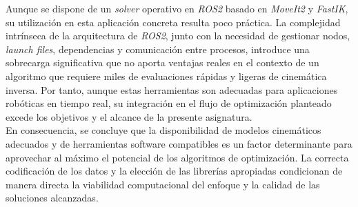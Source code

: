Aunque se dispone de un \textit{solver} operativo en \textit{ROS2} basado en \textit{MoveIt2} y 
\textit{FastIK}, su utilización en esta aplicación concreta resulta poco práctica. La complejidad 
intrínseca de la arquitectura de \textit{ROS2}, junto con la necesidad de gestionar nodos, 
\textit{launch files}, dependencias y comunicación entre procesos, introduce una sobrecarga 
significativa que no aporta ventajas reales en el contexto de un algoritmo que requiere miles de 
evaluaciones rápidas y ligeras de cinemática inversa. Por tanto, aunque estas herramientas son 
adecuadas para aplicaciones robóticas en tiempo real, su integración en el flujo de optimización 
planteado excede los objetivos y el alcance de la presente asignatura. \\

En consecuencia, se concluye que la disponibilidad de modelos cinemáticos adecuados y de 
herramientas software compatibles es un factor determinante para aprovechar al máximo el 
potencial de los algoritmos de optimización. La correcta codificación de los datos y la elección de 
las librerías apropiadas condicionan de manera directa la viabilidad computacional del enfoque y 
la calidad de las soluciones alcanzadas.
